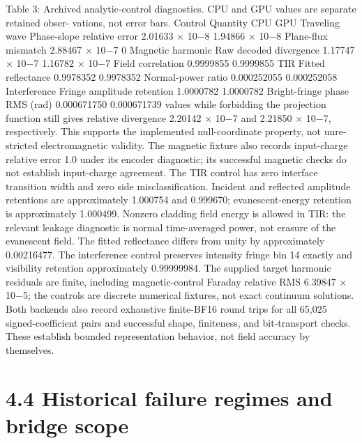 \documentclass[11pt]{article}
\begin{document}
Table 3: Archived analytic-control diagnostics. CPU and GPU values are separate retained obser-
vations, not error bars.
Control Quantity CPU GPU
Traveling wave Phase-slope relative error 2.01633 \ensuremath{\times} 10\ensuremath{-}8 1.94866 \ensuremath{\times} 10\ensuremath{-}8
Plane-flux mismatch 2.88467 \ensuremath{\times} 10\ensuremath{-}7 0
Magnetic harmonic Raw decoded divergence 1.17747 \ensuremath{\times} 10\ensuremath{-}7 1.16782 \ensuremath{\times} 10\ensuremath{-}7
Field correlation 0.9999855 0.9999855
TIR Fitted reflectance 0.9978352 0.9978352
Normal-power ratio 0.000252055 0.000252058
Interference Fringe amplitude retention 1.0000782 1.0000782
Bright-fringe phase RMS (rad) 0.000671750 0.000671739
values while forbidding the projection function still gives relative divergence 2.20142 \ensuremath{\times} 10\ensuremath{-}7 and
2.21850 \ensuremath{\times} 10\ensuremath{-}7, respectively. This supports the implemented null-coordinate property, not unre-
stricted electromagnetic validity. The magnetic fixture also records input-charge relative error 1.0
under its encoder diagnostic; its successful magnetic checks do not establish input-charge agreement.
The TIR control has zero interface transition width and zero side misclassification. Incident
and reflected amplitude retentions are approximately 1.000754 and 0.999670; evanescent-energy
retention is approximately 1.000499. Nonzero cladding field energy is allowed in TIR: the relevant
leakage diagnostic is normal time-averaged power, not erasure of the evanescent field. The fitted
reflectance differs from unity by approximately 0.00216477. The interference control preserves
intensity fringe bin 14 exactly and visibility retention approximately 0.99999984. The supplied
target harmonic residuals are finite, including magnetic-control Faraday relative RMS 6.39847 \ensuremath{\times}
10\ensuremath{-}5; the controls are discrete numerical fixtures, not exact continuum solutions.
Both backends also record exhaustive finite-BF16 round trips for all 65,025 signed-coefficient pairs
and successful shape, finiteness, and bit-transport checks. These establish bounded representation
behavior, not field accuracy by themselves.

\section*{4.4 Historical failure regimes and bridge scope}
\end{document}
